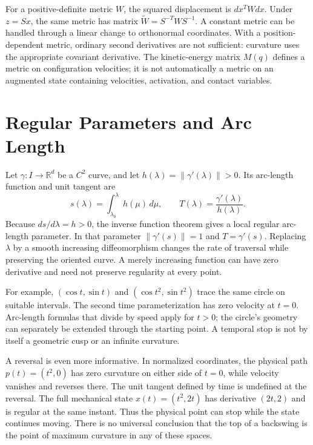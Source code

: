 \documentclass[12pt, openany]{book}
\theoremstyle{plain}
\begin{document}
For a positive-definite metric $W$, the squared displacement is
$dx^T W dx$. Under $z=Sx$, the same metric has matrix
$\widetilde W=S^{-T}WS^{-1}$. A constant metric can be handled through a
linear change to orthonormal coordinates. With a position-dependent metric,
ordinary second derivatives are not sufficient: curvature uses the
appropriate covariant derivative. The kinetic-energy matrix $M(q)$ defines
a metric on configuration velocities; it is not automatically a metric on
an augmented state containing velocities, activation, and contact variables.

\section{Regular Parameters and Arc Length}

Let $\gamma:I\rightarrow\mathbb R^d$ be a $C^2$ curve, and let
$h(\lambda)=\|\gamma'(\lambda)\|>0$. Its arc-length function and unit tangent are
\begin{equation}\label{eq:arc_length}
 s(\lambda)=\int_{\lambda_0}^{\lambda}h(\mu)\,d\mu,
 \qquad T(\lambda)=\frac{\gamma'(\lambda)}{h(\lambda)}.
\end{equation}
Because $ds/d\lambda=h>0$, the inverse function theorem gives a local regular
arc-length parameter. In that parameter $\|\gamma'(s)\|=1$ and
$T=\gamma'(s)$. Replacing $\lambda$ by a smooth increasing diffeomorphism
changes the rate of traversal while preserving the oriented curve.
A merely increasing function can have zero derivative and need not preserve
regularity at every point.

For example, $(\cos t,\sin t)$ and $(\cos t^2,\sin t^2)$ trace the same circle
on suitable intervals. The second time parameterization has zero velocity
at $t=0$. Arc-length formulas that divide by speed apply for $t>0$; the
circle's geometry can separately be extended through the starting point.
A temporal stop is not by itself a geometric cusp or an infinite curvature.

A reversal is even more informative. In normalized coordinates, the physical path
$p(t)=(t^2,0)$ has zero curvature on either side of $t=0$, while velocity
vanishes and reverses there. The unit tangent defined by time is undefined
at the reversal. The full mechanical state
$x(t)=(t^2,2t)$ has derivative $(2t,2)$ and is regular at the same instant.
Thus the physical point can stop while the state continues moving. There is
no universal conclusion that the top of a backswing is the point of maximum
curvature in any of these spaces.
\end{document}
